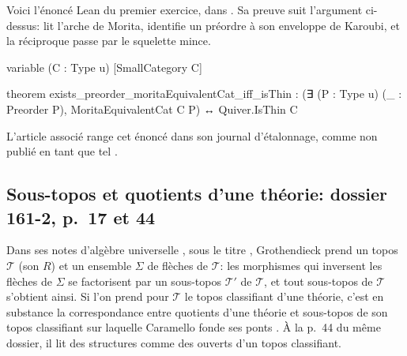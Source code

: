 Voici l'énoncé Lean du premier exercice, dans . Sa preuve suit l'argument ci-dessus:  lit l'arche de Morita,  identifie un préordre à son enveloppe de Karoubi, et la réciproque passe par le squelette mince.
\begin{leancode}
variable (C : Type u) [SmallCategory C]

theorem exists_preorder_moritaEquivalentCat_iff_isThin :
    (∃ (P : Type u) (_ : Preorder P), MoritaEquivalentCat C P) ↔
      Quiver.IsThin C
\end{leancode}
L'article associé range cet énoncé dans son journal d'étalonnage, comme non publié en tant que tel \cite{bridges-generator}.

\subsection{Sous-topos et quotients d'une théorie: dossier 161-2, p.~17 et 44}

Dans ses notes d'algèbre universelle \cite[p.~17]{grothendieck-161-2}, sous le titre , Grothendieck prend un topos $\mathcal T$ (son $R$) et un ensemble $\Sigma$ de flèches de $\mathcal T$: les morphismes qui inversent les flèches de $\Sigma$ se factorisent par un sous-topos $\mathcal T'$ de $\mathcal T$, et tout sous-topos de $\mathcal T$ s'obtient ainsi. Si l'on prend pour $\mathcal T$ le topos classifiant d'une théorie, c'est en substance la correspondance entre quotients d'une théorie et sous-topos de son topos classifiant sur laquelle Caramello fonde ses ponts \cite{caramello-tst}. À la p.~44 du même dossier, il lit des structures comme des ouverts d'un topos classifiant.
